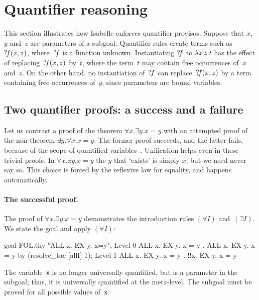 \section{Quantifier reasoning}
This section illustrates how Isabelle enforces quantifier provisos.
Suppose that $x$, $y$ and~$z$ are parameters of a subgoal.  Quantifier
rules create terms such as~${?\!f}(x,z)$, where~${?\!f}$ is a function
unknown.  Instantiating ${?\!f}$ to $\lambda x\,z.t$ has the effect of
replacing~${?\!f}(x,z)$ by~$t$, where the term~$t$ may contain free
occurrences of~$x$ and~$z$.  On the other hand, no instantiation
of~${?\!f}$ can replace~${?\!f}(x,z)$ by a term containing free
occurrences of~$y$, since parameters are bound variables.

\subsection{Two quantifier proofs: a success and a failure}
Let us contrast a proof of the theorem $\forall x.\exists y.x=y$ with an
attempted proof of the non-theorem $\exists y.\forall x.x=y$.  The former
proof succeeds, and the latter fails, because of the scope of quantified
variables~\cite{paulson-found}.  Unification helps even in these trivial
proofs.  In $\forall x.\exists y.x=y$ the $y$ that `exists' is simply $x$,
but we need never say so.  This choice is forced by the reflexive law for
equality, and happens automatically.

\paragraph{The successful proof.}
The proof of $\forall x.\exists y.x=y$ demonstrates the introduction rules
$(\forall I)$ and~$(\exists I)$.  We state the goal and apply $(\forall I)$:
\begin{ttbox}
goal FOL.thy "ALL x. EX y. x=y";
{\out Level 0}
{\out ALL x. EX y. x = y}
{. ALL x. EX y. x = y}
\ttbreak
by (resolve_tac [allI] 1);
{\out Level 1}
{\out ALL x. EX y. x = y}
{. !!x. EX y. x = y}
\end{ttbox}
The variable~{\tt x} is no longer universally quantified, but is a
parameter in the subgoal; thus, it is universally quantified at the
meta-level.  The subgoal must be proved for all possible values of~{\tt x}.

